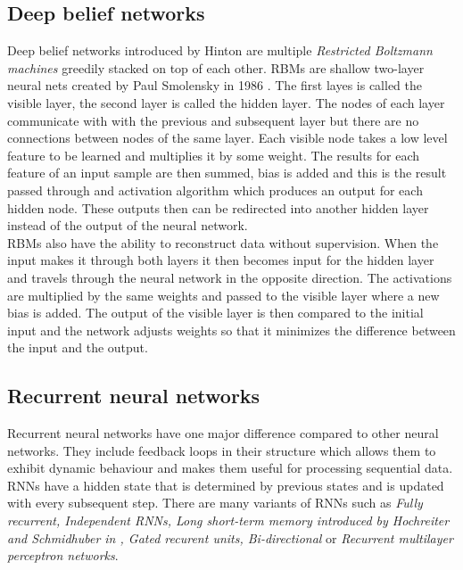 \subsection{Deep belief networks}
Deep belief networks introduced by Hinton \cite{Hinton504} are multiple \textit{Restricted Boltzmann machines} greedily stacked on top of each other. RBMs are shallow two-layer neural nets created by Paul Smolensky in 1986 \cite{Smolensky1986InformationPI}. The first layes is called the visible layer, the second layer is called the hidden layer. The nodes of each layer communicate with with the previous and subsequent layer but there are no connections between nodes of the same layer. Each visible node takes a low level feature to be learned and multiplies it by some weight. The results for each feature of an input sample are then summed, bias is added and this is the result passed through and activation algorithm which produces an output for each hidden node. These outputs then can be redirected into another hidden layer instead of the output of the neural network. \\
RBMs also have the ability to reconstruct data without supervision. When the input makes it through both layers it then becomes input for the hidden layer and travels through the neural network in the opposite direction. The activations are multiplied by the same weights and passed to the visible layer where a new bias is added. The output of the visible layer is then compared to the initial input and the network adjusts weights so that it minimizes the difference between the input and the output.

\subsection{Recurrent neural networks}
Recurrent neural networks have one major difference compared to other neural networks. They include feedback loops in their structure which allows them to exhibit dynamic behaviour and makes them useful for processing sequential data. RNNs have a hidden state that is determined by previous states and is updated with every subsequent step. There are many variants of RNNs such as \textit{Fully recurrent, Independent RNNs, Long short-term memory introduced by Hochreiter and Schmidhuber in \cite{doi:10.1162/neco.1997.9.8.1735}, Gated recurent units, Bi-directional} or \textit{Recurrent multilayer perceptron networks}. 

